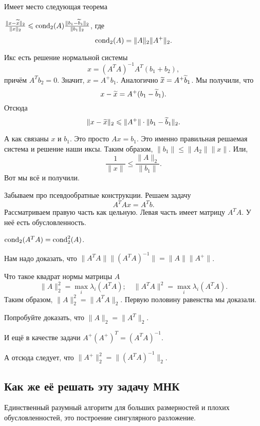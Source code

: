 Имеет место следующая теорема
\begin{The}
$\frac{\|x-\widetilde{x}{}\|_2}{\|x\|_2}\leqslant \operatorname{cond}_2(A) \frac{\|b_1-\widetilde{b}{}_1\|_2}{\|b_1\|_2}$, где
\[
  \operatorname{cond}_2(A) = \|A\|_2\|A^+\|_2.
\]
\end{The}
\begin{Proof}
  Икс есть решение нормальной системы
\[
  x = (A^TA)^{-1} A^T(b_1+b_2),
\]
причём $A^Tb_2 = 0$. Значит, $x = A^+ b_1$. Аналогично $\widetilde{x}{} = A^+ \widetilde{b}{}_1$. Мы получили, что
\[
  x- \widetilde{x}{} =A^+(b_1-\widetilde{b}{}_1).
\]
Отсюда
\[
  \|x-\widetilde{x}{}\|_2\leqslant \|A^+\|\cdot \|b_1-\widetilde{b}{}_1\|_2.
\]

А как связаны $x$ и $b_1$. Это просто $Ax = b_1$. Это именно правильная решаемая система и решение наши иксы. Таким образом, $\|b_1\|\le \|A_2\|\|x\|$. Или, 
\[
\frac1{\|x\|}\le \frac{\|A\|_2}{\|b_1\|}.
\]
Вот мы всё и получили.
\end{Proof}

Забываем про псевдообратные конструкции. Решаем задачу
\[
  A^T A x = A^T b.
\]
Рассматриваем правую часть как цельную. Левая часть имеет матрицу $A^TA$. У неё есть обусловленность.
\begin{Ut}
  $\operatorname{cond}_2(A^TA) = \operatorname{cond}_2^2(A)$.
\end{Ut}
\begin{Proof}
Нам надо доказать, что $\|A^T A\| \|(A^TA)^{-1}\| = \|A\|\|A^+\|$.

 Что такое квадрат нормы матрицы $A$
\[
  \|A\|^2_2 = \max\limits_i \lambda_i(A^TA);\quad
  \|A^TA\|^2 = \max\limits_i \lambda_i(A^TA).
\]
Таким образом, $\|A\|^2_2 = \|A^T A\|_2$. Первую половину равенства мы доказали.

Попробуйте доказать, что $\|A\|_2 = \|A^T\|_2$.

И ещё в качестве задачи $A^+(A^+)^T = (A^TA)^{-1}$.

А отсюда следует, что $\|A^+\|^2_2 = \|(A^TA)^{-1}\|_2$.
\end{Proof}

\subsection{Как же её решать эту задачу МНК}
Единственный разумный алгоритм для больших размерностей и плохих обусловленностей, это построение сингулярного разложение.
